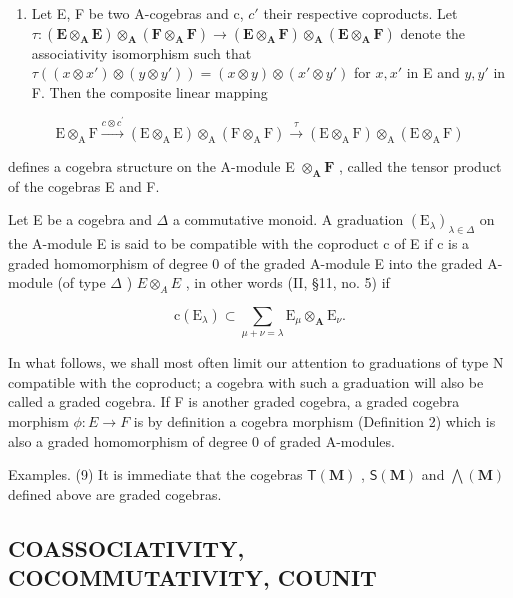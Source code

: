 \begin{enumerate}
\def\labelenumi{(\arabic{enumi})}
\setcounter{enumi}{7}
\tightlist
\item
  Let E, F be two A-cogebras and c, \(c'\) their respective coproducts. Let \(\tau:(\mathbf{E} \otimes_{\mathbf{A}} \mathbf{E}) \otimes_{\mathbf{A}} (\mathbf{F} \otimes_{\mathbf{A}} \mathbf{F}) \to (\mathbf{E} \otimes_{\mathbf{A}} \mathbf{F}) \otimes_{\mathbf{A}} (\mathbf{E} \otimes_{\mathbf{A}} \mathbf{F})\) denote the associativity isomorphism such that \(\tau((x \otimes x') \otimes (y \otimes y')) = (x \otimes y) \otimes (x' \otimes y')\) for \(x, x'\) in E and \(y, y'\) in F. Then the composite linear mapping
\end{enumerate}

\[
\mathrm{E} \otimes_ {\mathrm{A}} \mathrm{F} \xrightarrow {c \otimes c ^ {\prime}} (\mathrm{E} \otimes_ {\mathrm{A}} \mathrm{E}) \otimes_ {\mathrm{A}} (\mathrm{F} \otimes_ {\mathrm{A}} \mathrm{F}) \xrightarrow {\tau} (\mathrm{E} \otimes_ {\mathrm{A}} \mathrm{F}) \otimes_ {\mathrm{A}} (\mathrm{E} \otimes_ {\mathrm{A}} \mathrm{F})
\]

defines a cogebra structure on the A-module E \(\otimes_{\mathbf{A}}\mathbf{F}\) , called the tensor product of the cogebras E and F.

Let E be a cogebra and \(\Delta\) a commutative monoid. A graduation \((\mathrm{E}_{\lambda})_{\lambda\in\Delta}\) on the A-module E is said to be compatible with the coproduct c of E if c is a graded homomorphism of degree 0 of the graded A-module E into the graded A-module (of type \(\Delta\) ) \(E\otimes_{A}E\) , in other words (II, §11, no. 5) if

\[
\mathrm{c} (\mathrm{E} _ {\lambda}) \subset \sum_ {\mu + \nu = \lambda} \mathrm{E} _ {\mu} \otimes_ {\mathbf {A}} \mathrm{E} _ {\nu}.\tag{10}
\]

In what follows, we shall most often limit our attention to graduations of type N compatible with the coproduct; a cogebra with such a graduation will also be called a graded cogebra. If F is another graded cogebra, a graded cogebra morphism \(\phi:E\to F\) is by definition a cogebra morphism (Definition 2) which is also a graded homomorphism of degree 0 of graded A-modules.

Examples. (9) It is immediate that the cogebras \(\mathsf{T}(\mathbf{M})\) , \(\mathsf{S}(\mathbf{M})\) and \(\bigwedge (\mathbf{M})\) defined above are graded cogebras.

\subsection{COASSOCIATIVITY, COCOMMUTATIVITY, COUNIT}

